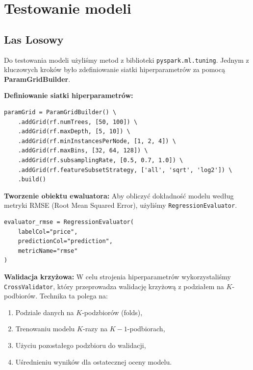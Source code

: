 \documentclass[12pt, a4paper]{report}
\begin{document}
\section{Testowanie modeli}

\subsection{Las Losowy}

\noindent Do testowania modeli użyliśmy metod z biblioteki \texttt{pyspark.ml.tuning}.  
Jednym z kluczowych kroków było zdefiniowanie siatki hiperparametrów za pomocą \textbf{ParamGridBuilder}.

\vspace{0.5em}

\noindent \textbf{Definiowanie siatki hiperparametrów:}
\begin{lstlisting}[caption={Siatka hiperparametrów dla modelu}]
paramGrid = ParamGridBuilder() \
    .addGrid(rf.numTrees, [50, 100]) \
    .addGrid(rf.maxDepth, [5, 10]) \
    .addGrid(rf.minInstancesPerNode, [1, 2, 4]) \
    .addGrid(rf.maxBins, [32, 64, 128]) \
    .addGrid(rf.subsamplingRate, [0.5, 0.7, 1.0]) \
    .addGrid(rf.featureSubsetStrategy, ['all', 'sqrt', 'log2']) \
    .build()
\end{lstlisting}

\vspace{1em}

\noindent \textbf{Tworzenie obiektu ewaluatora:}  
Aby obliczyć dokładność modelu według metryki RMSE (Root Mean Squared Error), użyliśmy \texttt{RegressionEvaluator}.

\begin{lstlisting}[caption={Ewaluator dla metryki RMSE}]
evaluator_rmse = RegressionEvaluator(
    labelCol="price",
    predictionCol="prediction",
    metricName="rmse"
)
\end{lstlisting}

\vspace{1em}

\noindent \textbf{Walidacja krzyżowa:}  
W celu strojenia hiperparametrów wykorzystaliśmy \texttt{CrossValidator}, który przeprowadza walidację krzyżową z podziałem na \( K \)-podbiorów.  
Technika ta polega na:
\begin{enumerate}
    \item Podziale danych na \( K \)-podzbiorów (folds),
    \item Trenowaniu modelu \( K \)-razy na \( K-1 \)-podbiorach,
    \item Użyciu pozostałego podzbioru do walidacji,
    \item Uśrednieniu wyników dla ostatecznej oceny modelu.
\end{enumerate}
\end{document}

